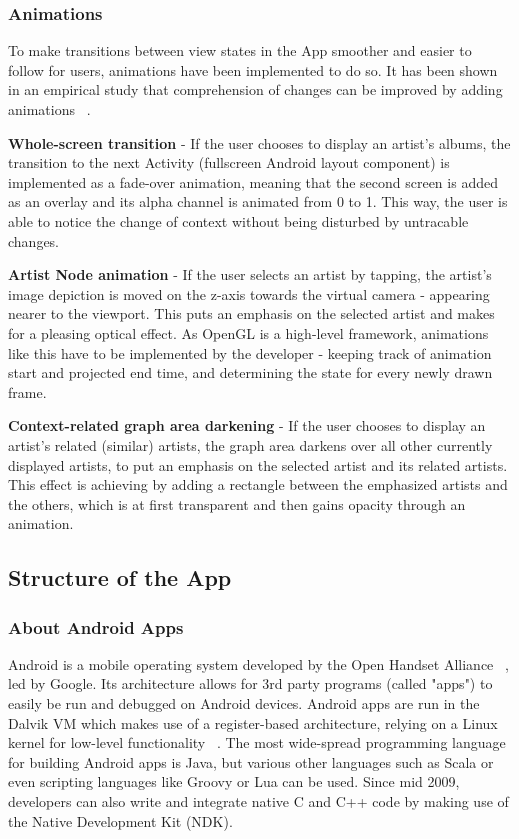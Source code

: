 \subsubsection{Animations}

To make transitions between view states in the App smoother and easier to follow for users, animations have been implemented to do so. It has been shown in an empirical study that comprehension of changes can be improved by adding animations ~\cite{Schlienger:2007}.

\textbf{Whole-screen transition} - If the user chooses to display an artist's albums, the transition to the next Activity (fullscreen Android layout component) is implemented as a fade-over animation, meaning that the second screen is added as an overlay and its alpha channel is animated from 0 to 1. This way, the user is able to notice the change of context without being disturbed by untracable changes.

\textbf{Artist Node animation} - If the user selects an artist by tapping, the artist's image depiction is moved on the z-axis towards the virtual camera - appearing nearer to the viewport. This puts an emphasis on the selected artist and makes for a pleasing optical effect. As OpenGL is a high-level framework, animations like this have to be implemented by the developer - keeping track of animation start and projected end time, and determining the state for every newly drawn frame.

\textbf{Context-related graph area darkening} - If the user chooses to display an artist's related (similar) artists, the graph area darkens over all other currently displayed artists, to put an emphasis on the selected artist and its related artists. This effect is achieving by adding a rectangle between the emphasized artists and the others, which is at first transparent and then gains opacity through an animation.

\subsection{Structure of the App}

\subsubsection{About Android Apps}

Android is a mobile operating system developed by the Open Handset Alliance ~\cite{url:openhandsetalliance}, led by Google. Its architecture allows for 3rd party programs (called "apps") to easily be run and debugged on Android devices.
Android apps are run in the Dalvik VM which makes use of a register-based architecture, relying on a Linux kernel for low-level functionality ~\cite{dalvik}. The most wide-spread programming language for building Android apps is Java, but various other languages such as Scala or even scripting languages like Groovy or Lua can be used. Since mid 2009, developers can also write and integrate native C and C++ code by making use of the Native Development Kit (NDK).

